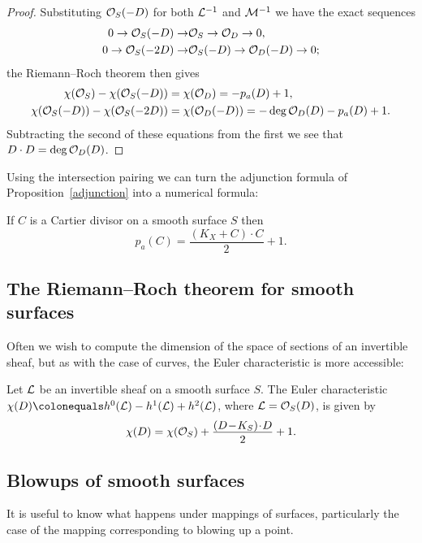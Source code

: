 \begin{proof}
Substituting ${\mathcal O}_{S}(-D)$ for both ${\mathcal L}^{-1}$ and ${\mathcal M}^{-1}$ we
have the
exact sequences
\begin{align*}
 0\to {\mathcal O}_{S}(-D)\to &\relax {\mathcal O}_{S}\to {\mathcal O}_{D}\to 0,\\
0\to {\mathcal O}_{S}(-2D)\to &\relax {\mathcal O}_{S}(-D)\to {\mathcal O}_{D}(-D)\to 0;
\end{align*}
the Riemann--Roch theorem 
then gives
\begin{align*}
\chi({\mathcal O}_{S}) -\chi({\mathcal O}_{S}(-D)) &= \chi({\mathcal O}_{D}) = -p_{a}(D) +1,\\
\chi({\mathcal O}_{S}(-D)) -\chi({\mathcal O}_{S}(-2D)) &= \chi({\mathcal O}_{D}(-D)) = -\deg {\mathcal O}_{D}(D) - p_{a}(D) +1.
\end{align*}
Subtracting the second of these equations from the first we see that
$D\cdot D = \deg {\mathcal O}_{D}(D)$.
\end{proof}

Using the intersection pairing we can turn the adjunction formula of Proposition~\ref{adjunction} into a numerical formula:

\begin{theorem}\label{adjunction formula} 
If $C$ is a Cartier divisor on a smooth surface $S$ then
%
$$
p_a(C) = \frac{(K_X+C)\cdot C}{2} +1.
 $$
\end{theorem}

\subsection*{The Riemann--Roch theorem for smooth surfaces}
Often we wish to compute the dimension of the space of sections of an invertible sheaf, but
as with the case of curves, the Euler characteristic is more accessible:

\begin{theorem} Let ${\mathcal L}$ be an invertible sheaf on a smooth surface $S$.
%
%
The Euler characteristic $\chi(D) \colonequals h^0(\sL)-h^1(\sL)+h^2(\sL)$, where ${\mathcal L} = {\mathcal O}_S(D)$, is given by
$$
\chi(D) = \chi(\sO_S) + \frac{(D-K_S)\cdot D}{2}+1
.
$$
\end{theorem}

\subsection*{Blowups of smooth surfaces}

It is useful to know what happens under mappings of surfaces, particularly the case of the mapping
%
corresponding to blowing up a point.

